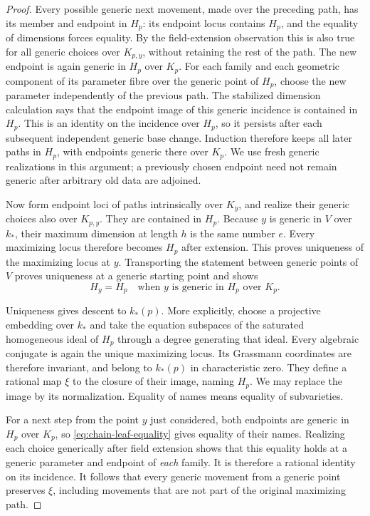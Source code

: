 \begin{proof}
Every possible generic next movement, made over the preceding path,
has its member and endpoint in $H_p$: its endpoint locus contains
$H_p$, and the equality of dimensions forces equality.  By the
field-extension observation this is also true for all generic choices
over $K_{p,y}$, without retaining the rest of the path.  The new endpoint
is again generic in $H_p$ over $K_p$.  For each family and each geometric component of its parameter fibre
over the generic point of $H_p$, choose the new parameter independently
of the previous path. The stabilized dimension calculation says that
the endpoint image of this generic incidence is contained in $H_p$.
This is an identity on the incidence over $H_p$, so it persists after
each subsequent independent generic base change. Induction therefore
keeps all later paths in $H_p$, with endpoints generic there over $K_p$.
We use fresh generic realizations in this argument; a previously chosen
endpoint need not remain generic after arbitrary old data are adjoined.

Now form endpoint loci of paths intrinsically over $K_y$, and realize
their generic choices also over $K_{p,y}$.  They are contained in $H_p$.
Because $y$ is generic in $V$ over $k_*$, their maximum dimension at
length $h$ is the same number $e$.  Every maximizing locus therefore
becomes $H_p$ after extension.  This proves uniqueness of the maximizing
locus at $y$.  Transporting the statement between generic points of $V$
proves uniqueness at a generic starting point and shows
\begin{equation}\label{eq:chain-leaf-equality}
 H_y=H_p
 \quad\text{when }y\text{ is generic in }H_p\text{ over }K_p.
\end{equation}

Uniqueness gives descent to $k_*(p)$.  More explicitly, choose a
projective embedding over $k_*$ and take the equation subspaces of the
saturated homogeneous ideal of $H_p$ through a degree generating that
ideal.  Every algebraic conjugate is again the unique maximizing locus.
Its Grassmann coordinates are therefore invariant, and belong to
$k_*(p)$ in characteristic zero.  They define a rational map $\xi$ to
the closure of their image, naming $H_p$.  We may replace the image by
its normalization.  Equality of names means equality of subvarieties.

For a next step from the point $y$ just considered, both endpoints are
generic in $H_p$ over $K_p$, so \eqref{eq:chain-leaf-equality} gives
equality of their names.  Realizing each choice generically after field
extension shows that this equality holds at a generic parameter and
endpoint of \emph{each} family.  It is therefore a rational identity on
its incidence.  It follows that every generic movement from a generic
point preserves $\xi$, including movements that are not part of the
original maximizing path.


\end{proof}
